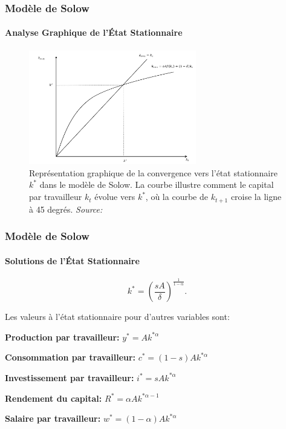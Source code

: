 \documentclass{beamer}
\begin{document}
\begin{frame}
    \frametitle{Modèle de Solow}
    \framesubtitle{Analyse Graphique de l'État Stationnaire}
    \begin{figure}
        \centering
        \includegraphics[width=0.65\textwidth]{graphs/ss_solow.png} %
        \caption{
        \footnotesize Représentation graphique de la convergence vers 
        l'état stationnaire \( k^* \) dans le modèle de Solow. 
        La courbe illustre comment le capital par travailleur \( k_t \) évolue vers 
        \( k^* \), où la courbe de \( k_{t+1} \) croise la ligne à 45 degrés.
        \textit{Source:} \textcite{Garin_etal_2021}}
    \end{figure}
\end{frame}

\begin{frame}
    \frametitle{Modèle de Solow}
    \framesubtitle{Solutions de l'État Stationnaire}
    
    \[
    k^* = \left(\frac{sA}{\delta}\right)^{\frac{1}{1-\alpha}}.
    \]

    \vspace*{5pt}

    \pause
    \vspace*{5pt}


    Les valeurs à l'état stationnaire pour d'autres variables sont:
    
    \textbf{Production par travailleur:} \( y^* = Ak^{* \alpha} \)
    
    \textbf{Consommation par travailleur:} \( c^* = (1 - s)Ak^{* \alpha} \)
    
    \textbf{Investissement par travailleur:} \( i^* = sAk^{* \alpha} \)
    
    \textbf{Rendement du capital:} \( R^* = \alpha Ak^{* \alpha - 1} \)
    
    \textbf{Salaire par travailleur:} \( w^* = (1 - \alpha) Ak^{* \alpha} \)
\end{frame}
\end{document}
